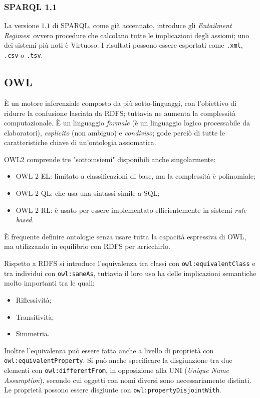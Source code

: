 \documentclass[11pt]{article}
\begin{document}
\subsubsection{SPARQL 1.1}
La versione $1.1$ di SPARQL, come già accennato, introduce gli \textit{Entailment Regimes}: ovvero procedure che calcolano tutte le implicazioni degli assiomi; uno dei sistemi più noti è Virtuoso.
I risultati possono essere esportati come \verb|.xml|, \verb|.csv| o \verb|.tsv|.

\subsection{OWL}
È un motore inferenziale composto da più sotto-linguaggi, con l'obiettivo di ridurre la confusione lasciata da RDFS; tuttavia ne aumenta la complessità computazionale.
È un linguaggio \textit{formale} (è un linguaggio logico processabile da elaboratori), \textit{esplicito} (non ambiguo) e \textit{condiviso}; gode perciò di tutte le caratteristiche chiave di un'ontologia assiomatica.

OWL2 comprende tre "sottoinsiemi" disponibili anche singolarmente:
\begin{itemize}
  \item OWL 2 EL: limitato a classificazioni di base, ma la complessità è polinomiale;
  \item OWL 2 QL: che usa una sintassi simile a SQL;
  \item OWL 2 RL: è usato per  essere implementato efficientemente in sistemi \textit{rule-based}.
\end{itemize}
È frequente definire ontologie senza usare tutta la capacità espressiva di OWL, ma utilizzando in equilibrio con RDFS per arricchirlo.

Rispetto a RDFS si introduce l'equivalenza tra classi con \verb|owl:equivalentClass| e tra individui con \verb|owl:sameAs|, tuttavia il loro uso ha delle implicazioni semantiche molto importanti tra le quali:
\begin{itemize}[noitemsep]
  \item Riflessività;
  \item Transitività;
  \item Simmetria.
\end{itemize}
Inoltre l'equivalenza può essere fatta anche a livello di proprietà con \verb|owl:equivalentProperty|.
Si può anche specificare la disgiunzione tra due elementi con \verb|owl:differentFrom|, in opposizione alla UNI (\textit{Unique Name Assumption}), secondo cui oggetti con nomi diversi sono necessariamente distinti.
Le proprietà possono essere disgiunte con \verb|owl:propertyDisjointWith|.
\end{document}
